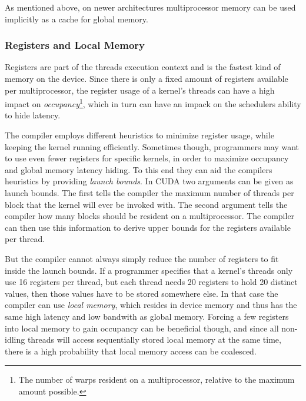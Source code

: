 
As mentioned above, on newer architectures multiprocessor memory can be used
implicitly as a cache for global memory.




\subsubsection{Registers and Local Memory}


Registers are part of the threads execution context and is the fastest kind of
memory on the device. Since there is only a fixed amount of registers available
per multiprocessor, the register usage of a kernel's threads can have a high
impact on \textit{occupancy}\footnote{The number of warps resident on a
  multiprocessor, relative to the maximum amount possible.}, which in turn can
have an impack on the schedulers ability to hide latency.


The compiler employs different heuristics to minimize register usage,
while keeping the kernel running efficiently. Sometimes though,
programmers may want to use even fewer registers for specific kernels,
in order to maximize occupancy and global memory latency hiding. To
this end they can aid the compilers heuristics by providing
\textit{launch bounds}. In CUDA two arguments can be given as launch
bounds. The first tells the compiler the maximum number of threads per
block that the kernel will ever be invoked with. The second argument
tells the compiler how many blocks should be resident on a
multiprocessor. The compiler can then use this information to derive
upper bounds for the registers available per thread.





But the compiler cannot always simply reduce the number of registers to fit
inside the launch bounds. If a programmer specifies that a kernel's threads only
use 16 registers per thread, but each thread needs 20 registers to hold 20
distinct values, then those values have to be stored somewhere else. In that
case the compiler can use \textit{local memory}, which resides in device memory
and thus has the same high latency and low bandwith as global memory. Forcing a
few registers into local memory to gain occupancy can be beneficial though, and
since all non-idling threads will access sequentially stored local memory at the
same time, there is a high probability that local memory access can be
coalesced.

